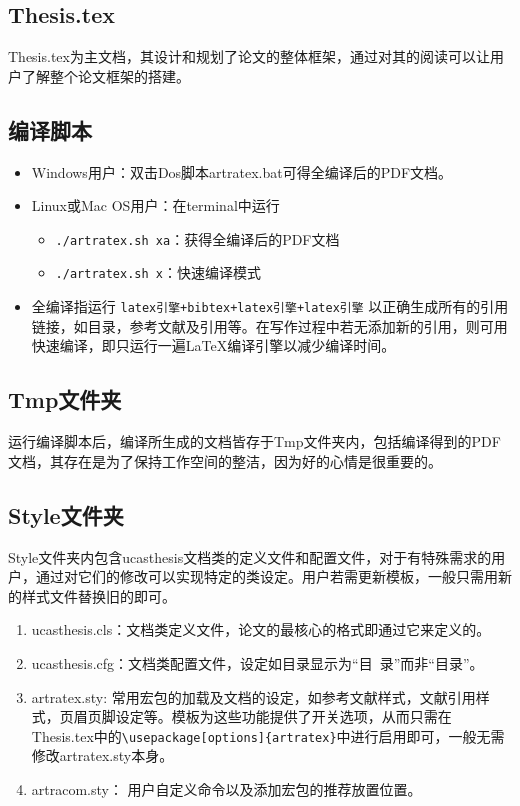 \subsection{Thesis.tex}

Thesis.tex为主文档，其设计和规划了论文的整体框架，通过对其的阅读可以让用户了解整个论文框架的搭建。

\subsection{编译脚本}

\begin{itemize}
    \item Windows用户：双击Dos脚本artratex.bat可得全编译后的PDF文档。
    \item Linux或Mac OS用户：在terminal中运行
        \begin{itemize}
            \item \verb|./artratex.sh xa|：获得全编译后的PDF文档
            \item \verb|./artratex.sh x|：快速编译模式
        \end{itemize}
    \item 全编译指运行 \verb|latex引擎+bibtex+latex引擎+latex引擎| 以正确生成所有的引用链接，如目录，参考文献及引用等。在写作过程中若无添加新的引用，则可用快速编译，即只运行一遍\LaTeX{}编译引擎以减少编译时间。
\end{itemize}

\subsection{Tmp文件夹}

运行编译脚本后，编译所生成的文档皆存于Tmp文件夹内，包括编译得到的PDF文档，其存在是为了保持工作空间的整洁，因为好的心情是很重要的。

\subsection{Style文件夹}

Style文件夹内包含ucasthesis文档类的定义文件和配置文件，对于有特殊需求的用户，通过对它们的修改可以实现特定的类设定。用户若需更新模板，一般只需用新的样式文件替换旧的即可。

\begin{enumerate}
    \item ucasthesis.cls：文档类定义文件，论文的最核心的格式即通过它来定义的。
    \item ucasthesis.cfg：文档类配置文件，设定如目录显示为“目~录”而非“目录”。
    \item artratex.sty: 常用宏包的加载及文档的设定，如参考文献样式，文献引用样式，页眉页脚设定等。模板为这些功能提供了开关选项，从而只需在Thesis.tex中的\verb+\usepackage[options]{artratex}+中进行启用即可，一般无需修改artratex.sty本身。
    \item artracom.sty： 用户自定义命令以及添加宏包的推荐放置位置。
\end{enumerate}

